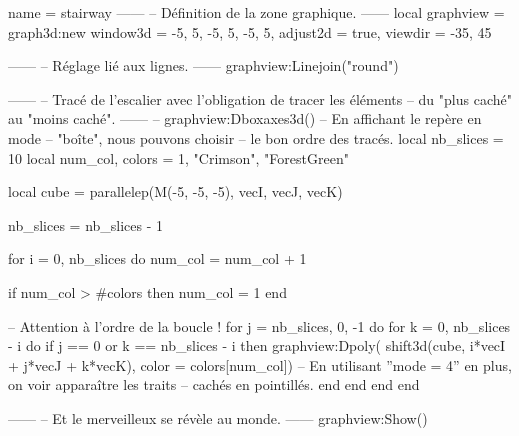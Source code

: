 \documentclass[border = 3pt]{standalone}
\begin{document}
\begin{luadraw}{name = stairway}
------
-- Définition de la zone graphique.
------
    local graphview = graph3d:new{
        window3d = {-5, 5, -5, 5, -5, 5},
        adjust2d = true,
        viewdir  = {-35, 45}
    }

------
-- Réglage lié aux lignes.
------
    graphview:Linejoin("round")

------
-- Tracé de l'escalier avec l'obligation de tracer les éléments
-- du "plus caché" au "moins caché".
------
--    graphview:Dboxaxes3d()  -- En affichant le repère en mode
                              -- "boîte", nous pouvons choisir
                              -- le bon ordre des tracés.
    local nb_slices = 10
    local num_col, colors = 1, {"Crimson", "ForestGreen"}

    local cube = parallelep(M(-5, -5, -5), vecI, vecJ, vecK)

	nb_slices = nb_slices - 1

    for i = 0, nb_slices do
        num_col = num_col + 1

        if num_col > #colors then
            num_col = 1
        end

-- Attention à l'ordre de la boucle !
        for j = nb_slices, 0, -1 do
            for k = 0, nb_slices - i do
                if j == 0 or k == nb_slices - i then
                    graphview:Dpoly(
                        shift3d(cube, i*vecI + j*vecJ + k*vecK),
                        {color = colors[num_col]})
-- En utilisant ''mode = 4'' en plus, on voir apparaître les traits
-- cachés en pointillés.
                end
            end
        end
    end

------
-- Et le merveilleux se révèle au monde.
------
    graphview:Show()
\end{luadraw}
\end{document}
